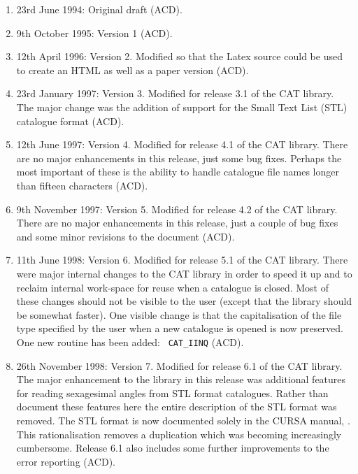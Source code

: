 \begin{enumerate}

  \item 23rd June 1994: Original draft (ACD).

  \item 9th October 1995: Version 1 (ACD).

  \item 12th April 1996: Version 2.  Modified so that the Latex source
   could be used to create an HTML as well as a paper version (ACD).

  \item 23rd January 1997: Version 3.  Modified for release 3.1 of the
   CAT library.  The major change was the addition of support for the
   Small Text List (STL) catalogue format (ACD).

  \item 12th June 1997: Version 4.  Modified for release 4.1 of the
   CAT library.  There are no major enhancements in this release, just
   some bug fixes.  Perhaps the most important of these is the ability
   to handle catalogue file names longer than fifteen characters (ACD).

  \item 9th November 1997: Version 5.  Modified for release 4.2 of the
   CAT library.  There are no major enhancements in this release, just
   a couple of bug fixes and some minor revisions to the document (ACD).

  \item 11th June 1998: Version 6.  Modified for release 5.1 of the
   CAT library.  There were major internal changes to the CAT library
   in order to speed it up and to reclaim internal work-space for
   reuse when a catalogue is closed.  Most of these changes should
   not be visible to the user (except that the library should be
   somewhat faster).  One visible change is that the capitalisation
   of the file type specified by the user when a new catalogue is
   opened is now preserved.  One new routine has been added: {\tt
   CAT\_IINQ} (ACD).

  \item 26th November 1998: Version 7.  Modified for release 6.1 of the
   CAT library.  The major enhancement to the library in this release
   was additional features for reading sexagesimal angles from STL
   format catalogues.  Rather than document these features here the
   entire description of the STL format was removed.  The STL format
   is now documented solely in the CURSA manual, .
   This rationalisation removes a duplication which was becoming
   increasingly cumbersome.  Release 6.1 also includes some further
   improvements to the error reporting (ACD).


\end{enumerate}
